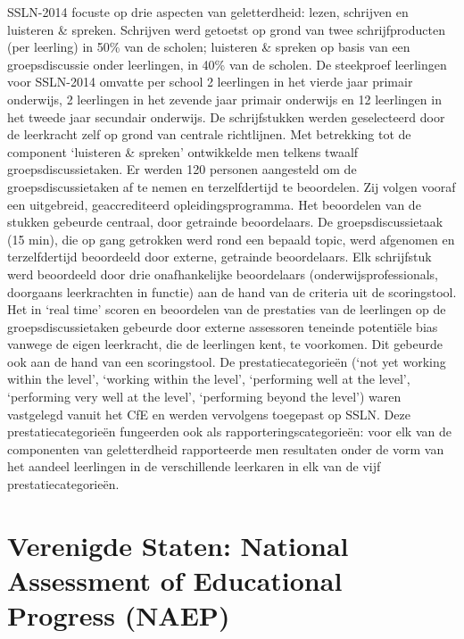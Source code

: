 \documentclass[
  letterpaper,
]{report}
\begin{document}
SSLN-2014 focuste op drie aspecten van geletterdheid: lezen, schrijven
en luisteren \& spreken. Schrijven werd getoetst op grond van twee
schrijfproducten (per leerling) in 50\% van de scholen; luisteren \&
spreken op basis van een groepsdiscussie onder leerlingen, in 40\% van
de scholen. De steekproef leerlingen voor SSLN-2014 omvatte per school 2
leerlingen in het vierde jaar primair onderwijs, 2 leerlingen in het
zevende jaar primair onderwijs en 12 leerlingen in het tweede jaar
secundair onderwijs. De schrijfstukken werden geselecteerd door de
leerkracht zelf op grond van centrale richtlijnen. Met betrekking tot de
component `luisteren \& spreken' ontwikkelde men telkens twaalf
groepsdiscussietaken. Er werden 120 personen aangesteld om de
groepsdiscussietaken af te nemen en terzelfdertijd te beoordelen. Zij
volgen vooraf een uitgebreid, geaccrediteerd opleidingsprogramma. Het
beoordelen van de stukken gebeurde centraal, door getrainde
beoordelaars. De groepsdiscussietaak (15 min), die op gang getrokken
werd rond een bepaald topic, werd afgenomen en terzelfdertijd beoordeeld
door externe, getrainde beoordelaars. Elk schrijfstuk werd beoordeeld
door drie onafhankelijke beoordelaars (onderwijsprofessionals, doorgaans
leerkrachten in functie) aan de hand van de criteria uit de
scoringstool. Het in `real time' scoren en beoordelen van de prestaties
van de leerlingen op de groepsdiscussietaken gebeurde door externe
assessoren teneinde potentiële bias vanwege de eigen leerkracht, die de
leerlingen kent, te voorkomen. Dit gebeurde ook aan de hand van een
scoringstool. De prestatiecategorieën (`not yet working within the
level', `working within the level', `performing well at the level',
`performing very well at the level', `performing beyond the level')
waren vastgelegd vanuit het CfE en werden vervolgens toegepast op SSLN.
Deze prestatiecategorieën fungeerden ook als rapporteringscategorieën:
voor elk van de componenten van geletterdheid rapporteerde men
resultaten onder de vorm van het aandeel leerlingen in de verschillende
leerkaren in elk van de vijf prestatiecategorieën.

\hypertarget{verenigde-staten-national-assessment-of-educational-progress-naep}{%
\section{Verenigde Staten: National Assessment of Educational Progress
(NAEP)}\label{verenigde-staten-national-assessment-of-educational-progress-naep}}
\end{document}
